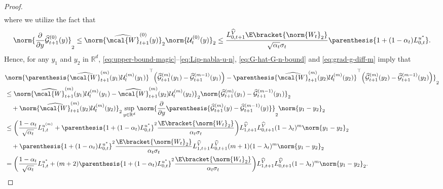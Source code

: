 \documentclass{article}
\newcommand{\R}{\mathbb{R}}
\begin{document}
\begin{proof}
\begin{align}
\end{align}
where we utilize the fact that
\begin{align*}
\norm{\frac{\partial}{\partial y} \widehat{\mathcal{G}}_{t+1}^{(0)}(y)}_2  \leq \norm{\widehat{\mcal{W}}_{t+1}^{{(0)}}(y)}_2\norm{\mathcal{U}^{(0)}_t(y)}_2 \leq \frac{L_{0, t+1}^{\widehat{V}}\E\bracket{\norm{W_{t}}_2}}{\sqrt{\alpha_{t}}\sigma_{t}}\parenthesis{1 + (1 - \alpha_{t})L_{0,t}^{u^{*}}}.
\end{align*}
Hence, for any $y_1$ and $y_2$ in $\R^d$, \eqref{eq:upper-bound-magic}--\eqref{eq:Lip-nabla-u-n}, \eqref{eq:G-hat-G-n-bound} and \eqref{eq:grad-g-diff-m} imply that
\begin{align}
    & \norm{ \parenthesis{\widehat{\mcal{W}}_{t+1}^{{(m)}}(y_1) \mathcal{U}^{(m)}_t(y_1)}^\top \Big(\widehat{\mathcal{G}}_{t+1}^{(m)}(y_1)-\widehat{\mathcal{G}}_{t+1}^{(m-1)}(y_1)\Big) - \parenthesis{\widehat{\mcal{W}}_{t+1}^{{(m)}}(y_2) \mathcal{U}^{(m)}_t(y_2)}^\top \Big(\widehat{\mathcal{G}}_{t+1}^{(m)}(y_2)-\widehat{\mathcal{G}}_{t+1}^{(m-1)}(y_2)\Big)}_2 \nonumber \\ & \leq \norm{ \widehat{\mcal{W}}_{t+1}^{{(m)}}(y_1) \mathcal{U}^{(m)}_t(y_1)  - \widehat{\mcal{W}}_{t+1}^{{(m)}}(y_2) \mathcal{U}^{(m)}_t(y_2)}_2\norm{\widehat{\mathcal{G}}_{t+1}^{(m)}(y_1)-\widehat{\mathcal{G}}_{t+1}^{(m-1)}(y_1)}_2 \nonumber \\ & \quad + \norm{\widehat{\mcal{W}}_{t+1}^{{(m)}}(y_2) \mathcal{U}^{(m)}_t(y_2)}_2\sup_{y \in \R^d} \norm{\frac{\partial}{\partial y} \parenthesis{\widehat{\mathcal{G}}_{t+1}^{(m)}(y)-\widehat{\mathcal{G}}_{t+1}^{(m-1)}(y)}}_2 \norm{y_1 - y_2}_2 \nonumber \\ & \leq \bigg(\frac{1 - \alpha_{t}}{\sqrt{\alpha_{t}}} L_{1, t}^{u^{(m)}}  + \parenthesis{1 + (1 - \alpha_{t})L_{0,t}^{u^{*}}}^{2}\frac{\E\bracket{\norm{W_{t}}_2}}{\alpha_t\sigma_{t}}\bigg)L_{1, t+1}^{\widehat{V}}L_{0, t+1}^{\widehat{V}}( 1- \lambda_t)^{m}\norm{y_1 - y_2}_2 \nonumber \\ & \quad + \parenthesis{1 + (1 - \alpha_{t})L_{0,t}^{u^{*}}}^2\frac{\E\bracket{\norm{W_{t}}_2}}{\alpha_{t}\sigma_{t}}L_{1, t+1}^{\widehat{V}}L_{0, t+1}^{\widehat{V}}(m+1)(1 - \lambda_t)^m \norm{y_1 - y_2}_2 \nonumber \\ & = \bigg(\frac{1 - \alpha_{t}}{\sqrt{\alpha_{t}}} L_{1, t}^{u^{*}}  + (m+2)\parenthesis{1 + (1 - \alpha_{t})L_{0,t}^{u^{*}}}^{2}\frac{\E\bracket{\norm{W_{t}}_2}}{\alpha_t\sigma_{t}}\bigg)L_{1, t+1}^{\widehat{V}}L_{0, t+1}^{\widehat{V}}( 1- \lambda_t)^{m}\norm{y_1 - y_2}_2. \label{eq:lip-wu-g-diff-m}
\end{align}


\end{proof}
\end{document}
